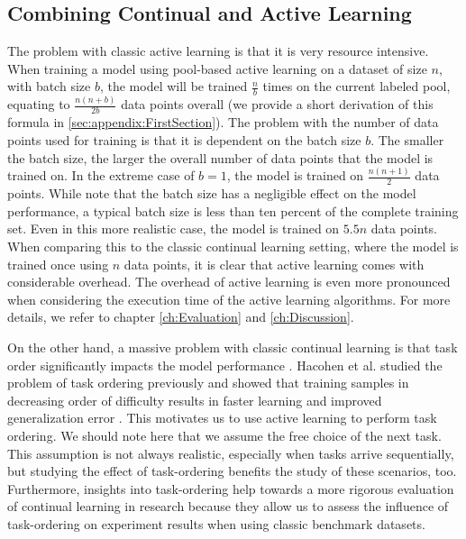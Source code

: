 \subsection{Combining Continual and Active Learning}
\label{sec:Methodology:CombiningCLandAL}
The problem with classic active learning is that it is very resource intensive. When training a model using pool-based active learning on a dataset of size $n$,
with batch size $b$, the model will be trained $\frac{n}{b}$ times on the current labeled pool, equating to $\frac{n(n+b)}{2b}$ data points overall (we provide a
short derivation of this formula in \ref{sec:appendix:FirstSection}). The problem with the number of data points used for training is that it is dependent on the
batch size $b$. The smaller the batch size, the larger the overall number of data points that the model is trained on. In the extreme case of $b=1$, the model
is trained on $\frac{n(n+1)}{2}$ data points. While \cite{beck2021effective} note that the batch size has a negligible effect on the model performance, a typical
batch size is less than ten percent of the complete training set. Even in this more realistic case, the model is trained on $5.5n$ data points. When
comparing this to the classic continual learning setting, where the model is trained once using $n$ data points, it is clear that active learning comes with
considerable overhead. The overhead of active learning is even more pronounced when considering the execution time of the active learning algorithms.
For more details, we refer to chapter \ref{ch:Evaluation} and \ref{ch:Discussion}. \par
On the other hand, a massive problem with classic continual learning is that task order significantly impacts the model performance \cite{bell2022effect}.
Hacohen et al. studied the problem of task ordering previously and showed that training samples in decreasing order of difficulty results in faster learning and
improved generalization error \cite{hacohen2019power}. This motivates us to use active learning to perform task ordering. We should note here that we
assume the free choice of the next task. This assumption is not always realistic, especially when tasks arrive sequentially, but studying the effect of task-ordering
benefits the study of these scenarios, too. Furthermore, insights into task-ordering help towards a more rigorous evaluation of continual learning in 
research because they allow us to assess the influence of task-ordering on experiment results when using classic benchmark datasets. \par
